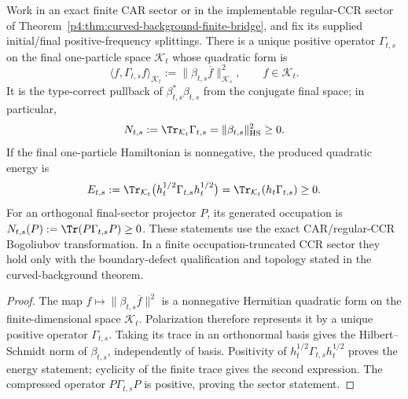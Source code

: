 \documentclass[12pt,a4paper]{article}
\begin{document}
\begin{theorem}
\label{p4:thm:positive-production-density}
Work in an exact finite CAR sector or in the implementable regular-CCR sector
of Theorem~\ref{p4:thm:curved-background-finite-bridge}, and fix its supplied
initial/final positive-frequency splittings.  There is a unique positive
operator \(\Gamma_{t,s}\) on the final one-particle space \(\mathcal K_t\)
whose quadratic form is
\begin{equation}
 \label{p4:eq:production-density-quadratic-form}
 \langle f,\Gamma_{t,s}f\rangle_{\mathcal K_t}
 :=\|\beta_{t,s}\overline f\|_{\mathcal K_s}^{2},
 \qquad f\in\mathcal K_t.
\end{equation}
It is the type-correct pullback of \(\beta_{t,s}^*\beta_{t,s}\) from the
conjugate final space; in particular,
\begin{equation}
 \label{p4:eq:produced-number-and-energy}
 N_{t,s}:=\Tr_{\mathcal K_t}\Gamma_{t,s}
 =\|\beta_{t,s}\|_{\rm HS}^{2}\ge0.
\end{equation}
If the final one-particle Hamiltonian is nonnegative, the produced quadratic
energy is
\begin{equation}
 \label{p4:eq:produced-positive-energy}
 E_{t,s}:=\Tr_{\mathcal K_t}
 \bigl(h_t^{1/2}\Gamma_{t,s}h_t^{1/2}\bigr)
 =\Tr_{\mathcal K_t}(h_t\Gamma_{t,s})\ge0.
\end{equation}
For an orthogonal final-sector projector \(P\), its generated occupation is
\(N_{t,s}(P):=\Tr(P\Gamma_{t,s}P)\ge0\).  These statements use the exact
CAR/regular-CCR Bogoliubov transformation.  In a finite
occupation-truncated CCR sector they hold only with the boundary-defect
qualification and topology stated in the curved-background theorem.
\end{theorem}

\begin{proof}
The map \(f\mapsto\|\beta_{t,s}\overline f\|^2\) is a nonnegative Hermitian
quadratic form on the finite-dimensional space \(\mathcal K_t\).  Polarization
therefore represents it by a unique positive operator \(\Gamma_{t,s}\).
Taking its trace in an orthonormal basis gives the Hilbert--Schmidt norm of
\(\beta_{t,s}\), independently of basis.  Positivity of
\(h_t^{1/2}\Gamma_{t,s}h_t^{1/2}\) proves the energy statement; cyclicity of
the finite trace gives the second expression.  The compressed operator
\(P\Gamma_{t,s}P\) is positive, proving the sector statement.
\end{proof}
\end{document}
